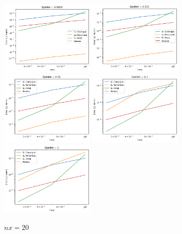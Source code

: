 \documentclass{article}
\begin{document}
\begin{figure}[!h]
    \centering
    \includegraphics[width=0.4\textwidth]{images/20ep21.png}
    \includegraphics[width=0.4\textwidth]{images/20ep22.png}
    \includegraphics[width=0.4\textwidth]{images/20ep23.png}
    \includegraphics[width=0.4\textwidth]{images/20ep24.png}
    \includegraphics[width=0.4\textwidth]{images/20ep25.png}
    \caption{$nx = 20$}
\end{figure}
\end{document}
